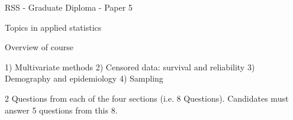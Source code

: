 RSS -  Graduate Diploma - Paper 5
 
 
Topics in applied statistics
 
Overview of course
 
1) Multivariate methods
2) Censored data: survival and reliability
3) Demography and epidemiology
4) Sampling 
 
2 Questions from each of the four sections (i.e. 8 Questions).
Candidates must answer 5 questions from this 8.
 
 
 

